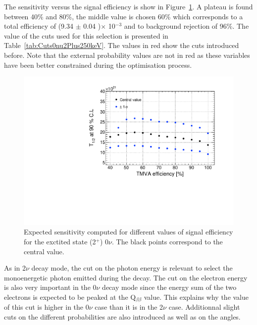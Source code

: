 \documentclass[main.tex]{subfiles}
\begin{document}
\FloatBarrier


\bigskip


\NI The sensitivity versus the signal efficiency is show in Figure~\ref{plot:SensVsEffbb0nu2_250}. A plateau is found between 40\% and 80\%, the middle value is chosen 60\% which corresponds to a total efficiency of (9.34 $\pm$ 0.04 )$\times$ 10$^{-\text{3}}$ and to background rejection of 96\%. The value of the cuts used for this selection is presented in Table~\ref{tab:Cuts0nu2Plus250keV}. The values in red show the cuts introduced before. Note that the external probability values are not in red as these variables have been better constrained during the optimisation process.


\begin{figure} [h!]
\begin{center}
\includegraphics[scale=0.5]{pictures/FinalResults/bb0nu2/SensVsEffbb0nu2.pdf}
\end{center}
\caption{Expected sensitivity computed for different values of signal efficiency for the exctited state (2$^+$) 0$\nu$. The black points correspond to the central value.}
\label{plot:SensVsEffbb0nu2_250}
\end{figure}


\NI As in 2$\nu$ decay mode, the cut on the photon energy is relevant to select the monoenergetic photon emitted during the decay. The cut on the electron energy is also very important in the 0$\nu$ decay mode since the energy sum of the two electrons is expected to be peaked at the Q$_{\beta\beta}$ value. This explains why the value of this cut is higher in the 0$\nu$ case than it is in the 2$\nu$ case. Additionnal slight cuts on the different probabilities are also introduced as well as on the angles. 
\end{document}
